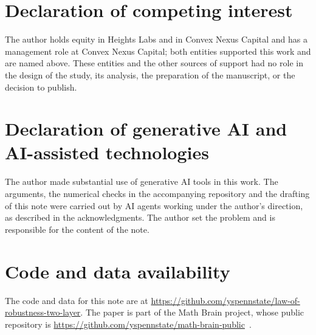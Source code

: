 \documentclass[11pt,reqno]{amsart}
\theoremstyle{plain}
\theoremstyle{definition}
\theoremstyle{remark}
\begin{document}
\section*{Declaration of competing interest}
The author holds equity in Heights Labs and in Convex Nexus Capital and has a management role at Convex Nexus Capital; both entities supported this work and are named above. These entities and the other sources of support had no role in the design of the study, its analysis, the preparation of the manuscript, or the decision to publish.

\section*{Declaration of generative AI and AI-assisted technologies}
The author made substantial use of generative AI tools in this work. The arguments, the numerical checks in the accompanying repository and the drafting of this note were carried out by AI agents working under the author's direction, as described in the acknowledgments. The author set the problem and is responsible for the content of the note.

\section*{Code and data availability}
{\sloppy The code and data for this note are at \url{https://github.com/yspennstate/law-of-robustness-two-layer}. The paper is part of the Math Brain project, whose public repository is \url{https://github.com/yspennstate/math-brain-public}~\cite{MathBrainRepo}.\par}
\end{document}
